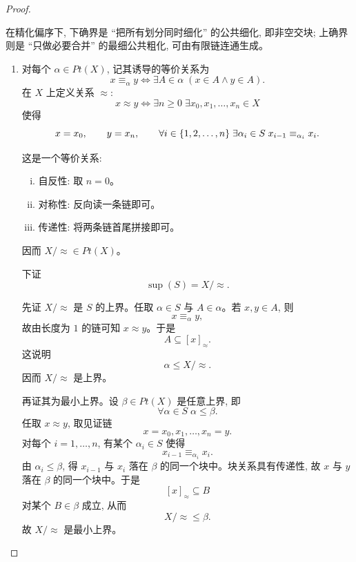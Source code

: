 \documentclass[a4paper, justified]{tufte-handout}
\begin{document}
\begin{proof}
  \begin{intention}
    在精化偏序下, 下确界是 ``把所有划分同时细化'' 的公共细化, 即非空交块; 上确界则是 ``只做必要合并'' 的最细公共粗化, 可由有限链连通生成。
  \end{intention}

  \begin{enumerate}[(1)]
    \item 对每个 $\alpha \in Pt(X)$, 记其诱导的等价关系为
      \[
        x \equiv_{\alpha} y
        \iff
        \exists A \in \alpha\; (x \in A \land y \in A).
      \]
      在 $X$ 上定义关系 $\approx$:
      \[
        x \approx y
        \iff
        \exists n \ge 0\; \exists x_0, x_1, \dots, x_n \in X
      \]
      使得
      \[
        x = x_0,
        \qquad
        y = x_n,
        \qquad
        \forall i \in \{1, 2, \dots, n\}\; \exists \alpha_i \in S\; x_{i-1} \equiv_{\alpha_i} x_i.
      \]

      这是一个等价关系:
      \begin{enumerate}[(i)]
        \item 自反性: 取 $n = 0$。
        \item 对称性: 反向读一条链即可。
        \item 传递性: 将两条链首尾拼接即可。
      \end{enumerate}
      因而 $X/\approx \in Pt(X)$。

      下证
      \[
        \sup(S) = X/\approx.
      \]

      先证 $X/\approx$ 是 $S$ 的上界。任取 $\alpha \in S$ 与 $A \in \alpha$。若 $x, y \in A$, 则
      \[
        x \equiv_{\alpha} y,
      \]
      故由长度为 $1$ 的链可知 $x \approx y$。于是
      \[
        A \subseteq [x]_{\approx}.
      \]
      这说明
      \[
        \alpha \le X/\approx.
      \]
      因而 $X/\approx$ 是上界。

      再证其为最小上界。设 $\beta \in Pt(X)$ 是任意上界, 即
      \[
        \forall \alpha \in S\; \alpha \le \beta.
      \]
      任取 $x \approx y$, 取见证链
      \[
        x = x_0, x_1, \dots, x_n = y.
      \]
      对每个 $i = 1, \dots, n$, 有某个 $\alpha_i \in S$ 使得
      \[
        x_{i-1} \equiv_{\alpha_i} x_i.
      \]
      由 $\alpha_i \le \beta$, 得 $x_{i-1}$ 与 $x_i$ 落在 $\beta$ 的同一个块中。块关系具有传递性, 故 $x$ 与 $y$ 落在 $\beta$ 的同一个块中。于是
      \[
        [x]_{\approx} \subseteq B
      \]
      对某个 $B \in \beta$ 成立, 从而
      \[
        X/\approx \le \beta.
      \]
      故 $X/\approx$ 是最小上界。


\end{enumerate}
\end{proof}
\end{document}
